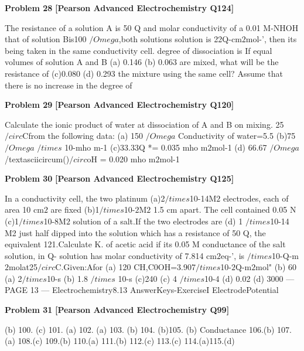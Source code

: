 \begin{problembox}
\textbf{Problem 28} \hfill \textbf{[Pearson Advanced Electrochemistry Q124]}
\label{q:ext-pearson-28}

The resistance of a solution A is 50 Q and
molar conductivity of a 0.01 M-NHOH
that of solution Bis100 $/Omega$,both solutions
solution is 22Q-cm$2$mol-', then its
being taken in the same conductivity cell.
degree of dissociation is
If equal volumes of solution A and B
(a) 0.146
(b) 0.063
are mixed, what will be the resistance of
(c)0.080
(d) 0.293
the mixture using the same cell? Assume
that there is no increase in the degree of
\end{problembox}

\begin{problembox}
\textbf{Problem 29} \hfill \textbf{[Pearson Advanced Electrochemistry Q120]}
\label{q:ext-pearson-29}

Calculate the ionic product of water at
dissociation of A and B on mixing.
25$/circ$Cfrom the following data:
(a) 150 $/Omega$
Conductivity of water=5.5
(b)75$/Omega$
$/times$ 10-mho m-1
(c)33.33Q
*= 0.035 mho m$2$mol-1
(d) 66.67 $/Omega$
/textasciicircum()$/circ$oH = 0.020 mho m$2$mol-1
\end{problembox}

\begin{problembox}
\textbf{Problem 30} \hfill \textbf{[Pearson Advanced Electrochemistry Q125]}
\label{q:ext-pearson-30}

In a conductivity cell, the two platinum
(a)2$/times$10-14M$2$
electrodes, each of area 10 cm$2$ are fixed
(b)1$/times$10-$2$M$2$
1.5 cm apart. The cell contained 0.05 N
(c)1$/times$10-8M$2$
solution of a salt.If the two electrodes are
(d) 1 $/times$10-14 M2
just half dipped into the solution which
has a resistance of 50 Q, the equivalent
121.Calculate K. of acetic acid if its 0.05 M
conductance of the salt solution, in Q-
solution has molar conductivity of 7.814
cm$2$eq-', is
$/times$10-Q-m$2$molat25$/circ$C.Given:Afor
(a) 120
CH,C0OH=3.907$/times$10-$2$Q-m$2$mol"
(b) 60
(a) 2$/times$10-s
(b) 1.8 $/times$ 10-s
(c)240
(c) 4 $/times$10-4
(d) 0.02
(d) 3000
--- PAGE 13 ---
Electrochemistry8.13
AnswerKeys-ExerciseI
ElectrodePotential
\end{problembox}

\begin{problembox}
\textbf{Problem 31} \hfill \textbf{[Pearson Advanced Electrochemistry Q99]}
\label{q:ext-pearson-31}

(b) 100. (c) 101. (a) 102. (a) 103. (b) 104. (b)105. (b)
Conductance
106.(b) 107. (a) 108.(c) 109.(b) 110.(a) 111.(b) 112.(c) 113.(c) 114.(a)115.(d)
\end{problembox}

